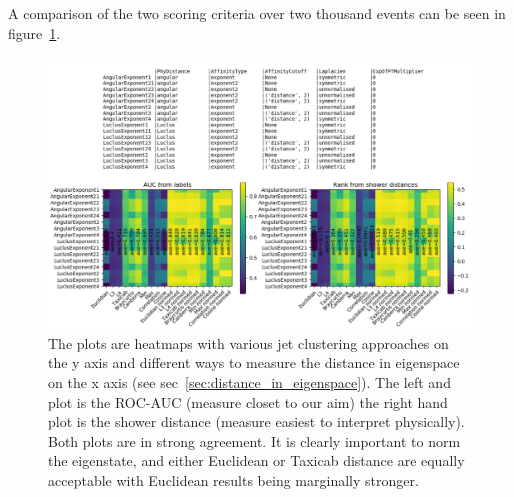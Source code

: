 A comparison of the two scoring criteria over two thousand events can be seen in figure~\ref{fig:eigenspace_distance_comparison}.
\begin{figure}[htp]
    \includegraphics[width=1.\textwidth]{graphics/eigenspace_distance_comparison}
    \caption{
        The plots are heatmaps with various jet clustering approaches on
        the y axis and different ways to measure the distance in eigenspace on the
        x axis (see sec~\ref{sec:distance_in_eigenspace}).
        The left and plot is the ROC-AUC (measure closet to our aim)
        the right hand plot is the shower distance (measure easiest to interpret physically).
        Both plots are in strong agreement.
        It is clearly important to norm the eigenstate, and either Euclidean or Taxicab distance
        are equally acceptable with Euclidean results being marginally stronger.
             }\label{fig:eigenspace_distance_comparison}
\end{figure}    
